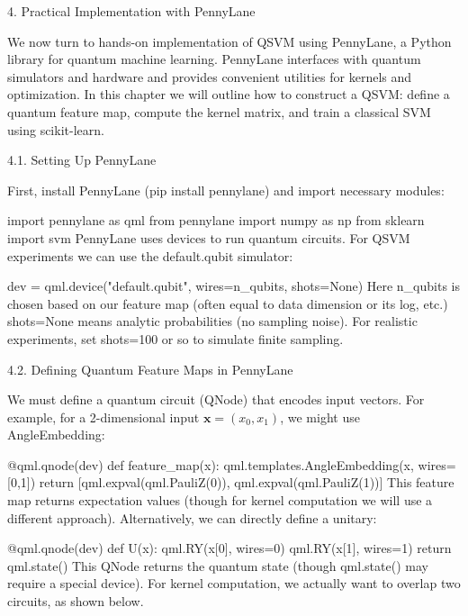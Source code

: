 4. Practical Implementation with PennyLane





We now turn to hands-on implementation of QSVM using PennyLane, a Python library for quantum machine learning.  PennyLane interfaces with quantum simulators and hardware and provides convenient utilities for kernels and optimization.  In this chapter we will outline how to construct a QSVM: define a quantum feature map, compute the kernel matrix, and train a classical SVM using scikit-learn.





4.1. Setting Up PennyLane





First, install PennyLane (pip install pennylane) and import necessary modules:

import pennylane as qml
from pennylane import numpy as np
from sklearn import svm
PennyLane uses devices to run quantum circuits.  For QSVM experiments we can use the default.qubit simulator:

dev = qml.device("default.qubit", wires=n_qubits, shots=None)
Here n_qubits is chosen based on our feature map (often equal to data dimension or its log, etc.)  shots=None means analytic probabilities (no sampling noise).  For realistic experiments, set shots=100 or so to simulate finite sampling.





4.2. Defining Quantum Feature Maps in PennyLane





We must define a quantum circuit (QNode) that encodes input vectors.  For example, for a 2-dimensional input $\mathbf{x}=(x_0,x_1)$, we might use AngleEmbedding:

@qml.qnode(dev)
def feature_map(x):
    qml.templates.AngleEmbedding(x, wires=[0,1])
    return [qml.expval(qml.PauliZ(0)), qml.expval(qml.PauliZ(1))]
This feature map returns expectation values (though for kernel computation we will use a different approach).  Alternatively, we can directly define a unitary:

@qml.qnode(dev)
def U(x):
    qml.RY(x[0], wires=0)
    qml.RY(x[1], wires=1)
    return qml.state()
This QNode returns the quantum state (though qml.state() may require a special device).  For kernel computation, we actually want to overlap two circuits, as shown below.





